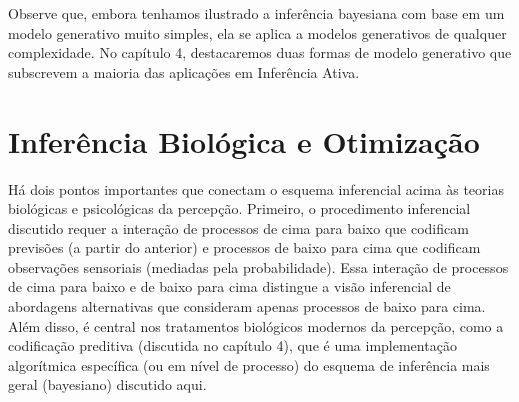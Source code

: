 \documentclass[
  12pt,
]{book}
\begin{document}
Observe que, embora tenhamos ilustrado a inferência bayesiana com base em um modelo generativo muito simples, ela se aplica a modelos generativos de qualquer complexidade. No capítulo 4, destacaremos duas formas de modelo generativo que subscrevem a maioria das aplicações em Inferência Ativa.

\hypertarget{inferuxeancia-bioluxf3gica-e-otimizauxe7uxe3o}{%
\section{Inferência Biológica e Otimização}\label{inferuxeancia-bioluxf3gica-e-otimizauxe7uxe3o}}

Há dois pontos importantes que conectam o esquema inferencial acima às teorias biológicas e psicológicas da percepção. Primeiro, o procedimento inferencial discutido requer a interação de processos de cima para baixo que codificam previsões (a partir do anterior) e processos de baixo para cima que codificam observações sensoriais (mediadas pela probabilidade). Essa interação de processos de cima para baixo e de baixo para cima distingue a visão inferencial de abordagens alternativas que consideram apenas processos de baixo para cima. Além disso, é central nos tratamentos biológicos modernos da percepção, como a codificação preditiva (discutida no capítulo 4), que é uma implementação algorítmica específica (ou em nível de processo) do esquema de inferência mais geral (bayesiano) discutido aqui.
\end{document}
